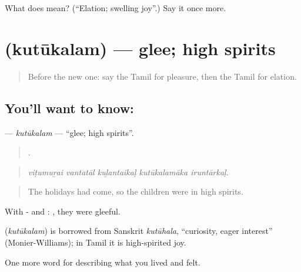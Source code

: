 \begin{tcolorbox}[breakable,colback=teal!4,colframe=teal!35!black,title={Before you move on}]
What does  mean? (\textquotedblleft{}Elation; swelling joy\textquotedblright{}.) Say it once more.
\end{tcolorbox}
\section[\texorpdfstring{\ta{குதூகலம்} (kutūkalam)}{குதூகலம் (kutūkalam)}]{ (kutūkalam) — glee; high spirits}

\label{lesson:TA-C459-kutukalam}



\begin{quote}
Before the new one: say the Tamil for pleasure, then the Tamil for elation.
\end{quote}

\subsection*{You'll want to know: }
\textbf{} — \emph{kutūkalam} — \textquotedblleft{}glee; high spirits\textquotedblright{}.

\begin{quote}
    .
\end{quote}

\begin{quote}
\emph{viṭumuṟai vantatāl kuḻantaikaḷ kutūkalamāka iruntārkaḷ.}
\end{quote}

\begin{quote}
The holidays had come, so the children were in high spirits.
\end{quote}

With - and :  , they were gleeful.

\begin{cousinweb}
\textbf{} (\emph{kutūkalam}) is borrowed from Sanskrit \emph{kutūhala}, \textquotedblleft{}curiosity, eager interest\textquotedblright{} (Monier-Williams); in Tamil it is high-spirited joy.
\end{cousinweb}

\begin{grammarlens}[title={What you've built}]
One more word for describing what you lived and felt.
\end{grammarlens}

